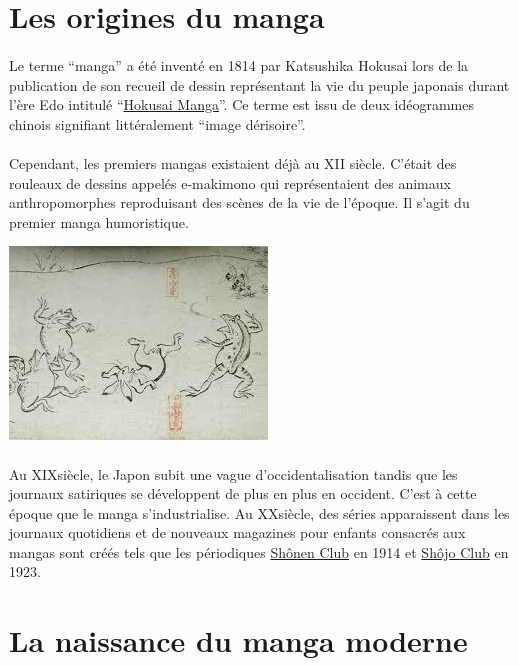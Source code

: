 \section{Les origines du manga}

\paragraph{} Le terme ``manga'' a été inventé en 1814 par Katsushika Hokusai
lors de la publication de son recueil de dessin représentant la vie du peuple
japonais durant l'ère Edo intitulé ``\underline{Hokusai Manga}''. Ce terme est
issu de deux idéogrammes chinois signifiant littéralement ``image dérisoire''.

\paragraph{} Cependant, les premiers mangas existaient déjà au XII\ieme
siècle.  C'était des rouleaux de dessins appelés e-makimono qui représentaient
des animaux anthropomorphes reproduisant des scènes de la vie de l'époque. Il
s'agit du premier manga humoristique.

\begin{center}
	\includegraphics[scale=0.7]{emakimono.jpg}
\end{center}

\paragraph{} Au XIX\ieme siècle, le Japon subit une vague d'occidentalisation
tandis que les journaux satiriques se développent de plus en plus en occident.
C'est à cette époque que le manga s'industrialise. Au XX\ieme siècle, des séries
apparaissent dans les journaux quotidiens et de nouveaux magazines pour enfants
consacrés aux mangas sont créés tels que les périodiques \underline{Shônen
Club} en 1914 et \underline{Shôjo Club} en 1923.

\section{La naissance du manga moderne}

